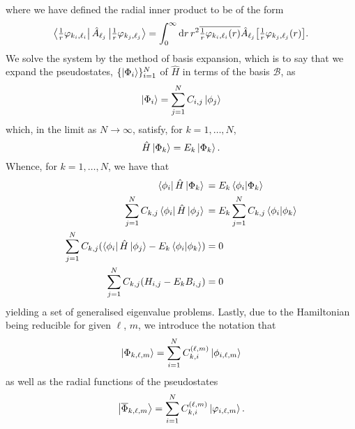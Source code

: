 \documentclass[]{article}
\begin{document}
where we have defined the radial inner product to be of the form
\begin{equation*}
  \bra{\tfrac{1}{r}\varphi_{k_{i}, \ell_{i}}}
  \hat{A}_{\ell_{j}}
  \ket{\tfrac{1}{r}\varphi_{k_{j}, \ell_{j}}}
  =
  \int_{0}^{\infty}
  \dd{r}
  {
    r^{2}
    \overline
    {
      \tfrac{1}{r}
      \varphi_{k_{i}, \ell_{i}}\lr{r}
    }
    \hat{A}_{\ell_{j}}
    \lrsq[\big]
    {
      \tfrac{1}{r}
      \varphi_{k_{j}, \ell_{j}}\lr{r}
    }
  }
  .
\end{equation*}
We solve the system by the method of basis expansion, which is to say that we
expand the pseudostates, $\lrset{\ket{\Phi_{i}}}_{i = 1}^{N}$ of $\hat{H}$ in
terms of the basis $\mathcal{B}$, as
\begin{equation*}
  \ket{\Phi_{i}}
  =
  \sum_{j = 1}^{N}
  C_{i, j}
  \ket{\phi_{j}}
\end{equation*}
which, in the limit as $N \to \infty$, satisfy, for $k = 1, \dotsc, N$,
\begin{equation*}
  \hat{H}
  \ket{\Phi_{k}}
  =
  E_{k}
  \ket{\Phi_{k}}
  .
\end{equation*}
Whence, for $k = 1, \dotsc, N$, we have that
\begin{alignat*}{2}
  \bra{\phi_{i}}
  \hat{H}
  \ket{\Phi_{k}}
  {}={}
  &
  E_{k}
  \bra{\phi_{i}}
  \ket{\Phi_{k}}
  \\
  \sum_{j = 1}^{N}
  C_{k, j}
  \bra{\phi_{i}}
  \hat{H}
  \ket{\phi_{j}}
  {}={}
  &
  E_{k}
  \sum_{j = 1}^{N}
  C_{k, j}
  \bra{\phi_{i}}
  \ket{\phi_{k}}
  \\
  \sum_{j = 1}^{N}
  C_{k, j}
  \lr
  {
    \bra{\phi_{i}}
    \hat{H}
    \ket{\phi_{j}}
    -
    E_{k}
    \bra{\phi_{i}}
    \ket{\phi_{k}}
  }
  {}={}
  &
  0
  \\
  \sum_{j = 1}^{N}
  C_{k, j}
  \lr
  {
    H_{i, j}
    -
    E_{k}
    B_{i, j}
  }
  {}={}
  &
  0
\end{alignat*}
yielding a set of generalised eigenvalue problems.
Lastly, due to the Hamiltonian being reducible for given $\ell$, $m$, we
introduce the notation that
\begin{equation*}
  \ket{\Phi_{k, \ell, m}}
  =
  \sum_{i = 1}^{N}
  C_{k, i}^{(\ell, m)}
  \ket{\phi_{i, \ell, m}}
\end{equation*}
as well as the radial functions of the pseudostates
\begin{equation*}
  \ket{\overline{\Phi}_{k, \ell, m}}
  =
  \sum_{i = 1}^{N}
  C_{k, i}^{(\ell, m)}
  \ket{\varphi_{i, \ell, m}}
  .
\end{equation*}
\end{document}

